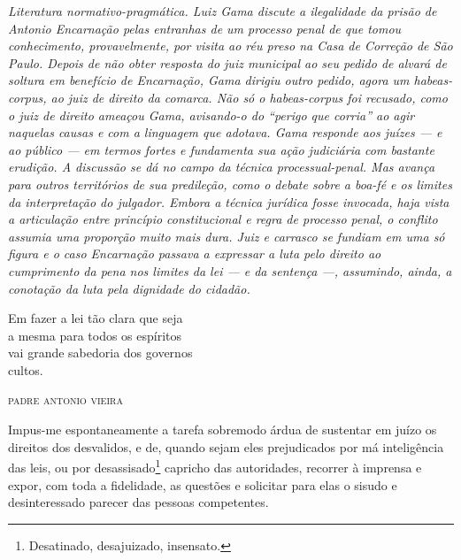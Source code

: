 \begin{didascalia}\itshape
Literatura normativo-pragmática. Luiz Gama discute a ilegalidade da
prisão de Antonio Encarnação pelas entranhas de um processo penal de que
tomou conhecimento, provavelmente, por visita ao réu preso na Casa de
Correção de São Paulo. Depois de não obter resposta do juiz municipal ao
seu pedido de alvará de soltura em benefício de Encarnação, Gama dirigiu
outro pedido, agora um \textnormal{habeas-corpus}, ao juiz de direito da
comarca. Não só o \textnormal{habeas-corpus} foi recusado, como o juiz de
direito ameaçou Gama, avisando-o do ``perigo que corria'' ao agir
naquelas causas e com a linguagem que adotava. Gama responde aos juízes
--- e ao público --- em termos fortes e fundamenta sua ação judiciária com
bastante erudição. A discussão se dá no campo da técnica
processual-penal. Mas avança para outros territórios de sua predileção,
como o debate sobre a boa-fé e os limites da interpretação do julgador.
Embora a técnica jurídica fosse invocada, haja vista a articulação entre
princípio constitucional e regra de processo penal, o conflito assumia
uma proporção muito mais dura. Juiz e carrasco se fundiam em uma só
figura e o caso Encarnação passava a expressar a luta pelo direito ao
cumprimento da pena nos limites da lei --- e da sentença ---, assumindo,
ainda, a conotação da luta pela dignidade do cidadão.
\end{didascalia}


\epigraph{Em fazer a lei tão clara que seja\\
a mesma para todos os espíritos\\
vai grande sabedoria dos governos\\
cultos.}{\textsc{padre antonio vieira}\footnotemark}

Impus-me espontaneamente a tarefa sobremodo árdua de sustentar em juízo
os direitos dos desvalidos, e de, quando sejam eles prejudicados por má
inteligência das leis, ou por desassisado\footnote{Desatinado,
  desajuizado, insensato.} capricho das autoridades, recorrer à imprensa
e expor, com toda a fidelidade, as questões e solicitar para elas o
sisudo e desinteressado parecer das pessoas competentes.

